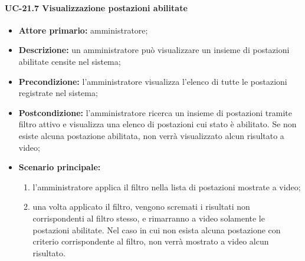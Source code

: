 \paragraph{UC-21.7 Visualizzazione postazioni abilitate}
\begin{itemize}
    \item \textbf{Attore primario:} amministratore;
    \item \textbf{Descrizione:} un amministratore pu\`{o} visualizzare un insieme di postazioni abilitate censite nel sistema;
    \item \textbf{Precondizione:} l'amministratore visualizza l'elenco di tutte le postazioni registrate nel sistema;
    \item \textbf{Postcondizione:} l'amministratore ricerca un insieme di postazioni tramite filtro attivo e visualizza una elenco di postazioni cui stato è abilitato. Se non esiste alcuna postazione abilitata, non verrà visualizzato alcun risultato a video;
    \item \textbf{Scenario principale:}
    \begin{enumerate}
        \item l'amministratore applica il filtro nella lista di postazioni mostrate a video;
        \item una volta applicato il filtro, vengono scremati i risultati non corrispondenti al filtro stesso, e rimarranno a video solamente le postazioni abilitate. Nel caso in cui non esista alcuna postazione con criterio corrispondente al filtro, non verrà mostrato a video alcun risultato.
    \end{enumerate}
\end{itemize}

